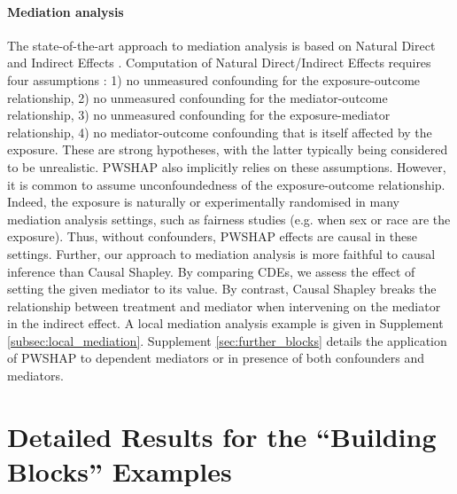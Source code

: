 \documentclass{article}
\theoremstyle{plain}
\theoremstyle{definition}
\theoremstyle{remark}
\theoremstyle{mystyle}
\begin{document}
\paragraph{Mediation analysis}\label{sec:med_analysis}

The state-of-the-art approach to mediation analysis is based on Natural Direct and Indirect Effects . Computation of Natural Direct/Indirect Effects requires four assumptions  : 1) no unmeasured confounding for the exposure-outcome relationship, 2) no unmeasured confounding for the mediator-outcome relationship, 3) no unmeasured confounding for the exposure-mediator relationship, 4) no mediator-outcome confounding that is itself affected by the exposure. These are strong hypotheses, with the latter typically being considered to be unrealistic.
PWSHAP also implicitly relies on these assumptions.
However, it is common to assume unconfoundedness of the exposure-outcome relationship. Indeed, the exposure is naturally or experimentally randomised in many mediation analysis settings, such as fairness studies (e.g. when sex or race are the exposure). Thus, without confounders, PWSHAP effects are causal in these settings. 
Further, our approach to mediation analysis is more faithful to causal inference than Causal Shapley. By comparing CDEs, we assess the effect of setting the given mediator to its value. By contrast, Causal Shapley breaks the relationship between treatment and mediator when intervening on the mediator in the indirect effect. A local mediation analysis example is given in Supplement \ref{subsec:local_mediation}. Supplement \ref{sec:further_blocks} details the application of PWSHAP to dependent mediators or in presence of both confounders and mediators.




\section{Detailed Results for the ``Building Blocks'' Examples} \label{sec:detailed_building_blocks}
\end{document}
